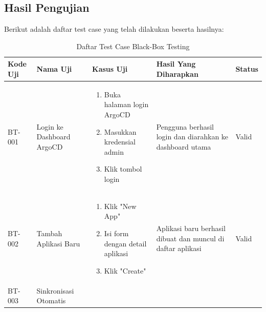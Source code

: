 \subsection{Hasil Pengujian}\label{subsec:hasil_pengujian}
Berikut adalah daftar test case yang telah dilakukan beserta hasilnya:
\begin{table}[h]
  \centering
  \caption{Daftar Test Case Black-Box Testing}
  \label{tab:test-case}
  \small
  \begin{adjustbox}{width=\textwidth}
    \begin{tabular}{|p{0.8cm}|p{2.2cm}|p{4cm}|p{3.5cm}|p{1.2cm}|}
      \hline
      \textbf{Kode Uji} & \textbf{Nama Uji}         & \textbf{Kasus Uji}                                               & \textbf{Hasil Yang Diharapkan}                                     & \textbf{Status} \\
      \hline
      BT-001            & Login ke Dashboard ArgoCD & \begin{enumerate}[leftmargin=*,noitemsep,topsep=0pt,label=\arabic*.,widest=99]
                                                        \item Buka halaman login ArgoCD
                                                        \item Masukkan kredensial admin
                                                        \item Klik tombol login
                                                      \end{enumerate}  & Pengguna berhasil login dan diarahkan ke dashboard utama           & Valid                                                           \\ \hline
      BT-002            & Tambah Aplikasi Baru      & \begin{enumerate}[leftmargin=*,noitemsep,topsep=0pt,label=\arabic*.,widest=99]
                                                        \item Klik "New App"
                                                        \item Isi form dengan detail aplikasi
                                                        \item Klik "Create"
                                                      \end{enumerate} & Aplikasi baru berhasil dibuat dan muncul di daftar aplikasi        & Valid                                                            \\ \hline
      BT-003            & Sinkronisasi Otomatis     & \begin{enumerate}[leftmargin=*,noitemsep,topsep=0pt,label=\arabic*.,widest=99]

\end{enumerate}
\end{tabular}
\end{adjustbox}
\end{table}
